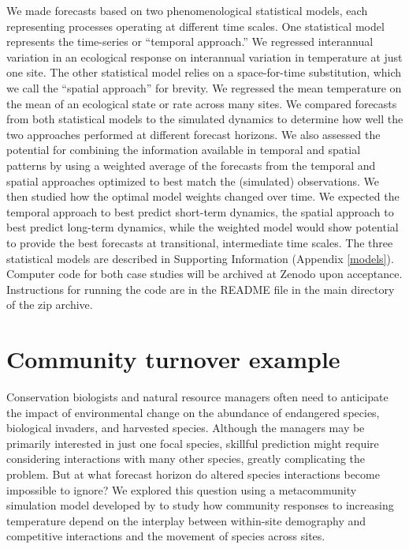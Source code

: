\documentclass[11pt]{article}
\begin{document}
We made forecasts based on two phenomenological statistical models, each representing processes operating at different time scales. One statistical model represents the time-series or ``temporal approach.'' We regressed interannual variation in an ecological response on interannual variation in temperature at just one site. The other statistical model relies on a space-for-time substitution, which we call the ``spatial approach'' for brevity. We regressed the mean temperature on the mean of an ecological state or rate across many sites.  We compared forecasts from both statistical models to the simulated dynamics to determine how well the two approaches performed at different forecast horizons. We also assessed the potential for combining the information available in temporal and spatial patterns by using a weighted average of the forecasts from the temporal and spatial approaches optimized to best match the (simulated) observations. We then studied how the optimal model weights changed over time. We expected the temporal approach to best predict short-term dynamics, the spatial approach to best predict long-term dynamics, while the weighted model would show potential to provide the best forecasts at transitional, intermediate time scales. The three statistical models are described in Supporting Information (Appendix \ref{models}). Computer code for both case studies will be archived at Zenodo upon acceptance. Instructions for running the code are in the README file in the main directory of the zip archive.

\section*{Community turnover example}

Conservation biologists and natural resource managers often need to anticipate the impact of environmental change on the abundance of 
endangered species, biological invaders, and harvested species. Although the managers may be primarily interested in just one focal species, skillful prediction might require considering interactions with many other species, greatly complicating the problem. But at what forecast horizon do altered species interactions become impossible to ignore? We explored this question using a metacommunity simulation model developed by \cite{alexander_lags_2018} to study how community responses to increasing temperature depend on the interplay between within-site demography and competitive interactions and the movement of species across sites.
\end{document}
